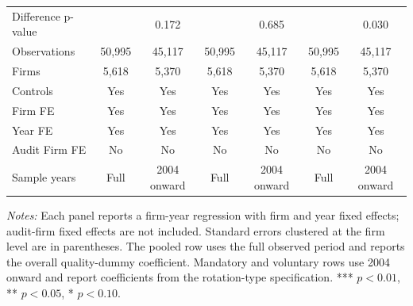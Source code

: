 \documentclass[10pt]{article}
\begin{document}
\begin{minipage}{19cm}
\begin{threeparttable}
\begin{tabular}{l cc cc cc}
Difference p-value &  & 0.172 &  & 0.685 &  & 0.030 \\
Observations & 50,995 & 45,117 & 50,995 & 45,117 & 50,995 & 45,117 \\
Firms & 5,618 & 5,370 & 5,618 & 5,370 & 5,618 & 5,370 \\
\midrule
Controls & Yes & Yes & Yes & Yes & Yes & Yes \\
Firm FE & Yes & Yes & Yes & Yes & Yes & Yes \\
Year FE & Yes & Yes & Yes & Yes & Yes & Yes \\
Audit Firm FE & No & No & No & No & No & No \\
Sample years & Full & 2004 onward & Full & 2004 onward & Full & 2004 onward \\
\bottomrule
\end{tabular}
\begin{tablenotes}\fontsize{9}{11}\selectfont
\item \fontsize{9}{11}\selectfont \textit{Notes:} Each panel reports a firm-year regression with firm and year fixed effects; audit-firm fixed effects are not included. Standard errors clustered at the firm level are in parentheses. The pooled row uses the full observed period and reports the overall quality-dummy coefficient. Mandatory and voluntary rows use 2004 onward and report coefficients from the rotation-type specification. *** \(p<0.01\), ** \(p<0.05\), * \(p<0.10\).
\end{tablenotes}
\end{threeparttable}

\end{minipage}
\end{document}
